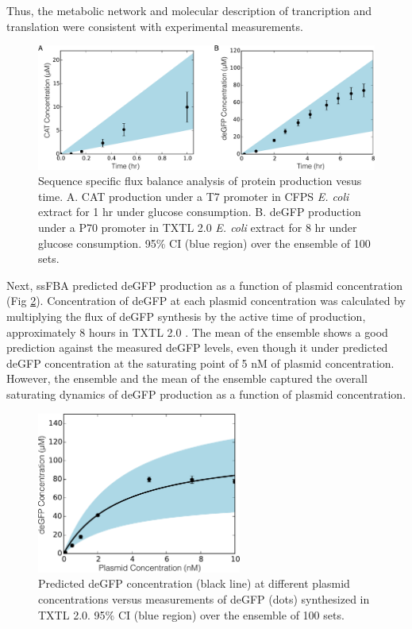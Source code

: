 \documentclass[journal=asbcd6,manuscript=article]{achemso}
\begin{document}
Thus, the metabolic network and molecular description of trancription and translation were consistent with experimental measurements.
\begin{figure}[t!]
\centering
\includegraphics[width=1.00\textwidth]{./Figures/CAT_GFP_prod.pdf}
\caption{Sequence specific flux balance analysis of protein production vesus time. A. CAT production under a T7 promoter in CFPS \textit{E. coli} extract for 1 hr under glucose consumption. B. deGFP production under a P70 promoter in TXTL 2.0 \textit{E. coli} extract for 8 hr under glucose consumption. 95\% CI (blue region) over the ensemble of 100 sets.}
\label{fig:CAT_GFP_prod}
\end{figure}

Next, ssFBA predicted deGFP production as a function of plasmid concentration (Fig \ref{fig:GFP_plasmid}).
Concentration of deGFP at each plasmid concentration was calculated by multiplying the flux of deGFP synthesis by the active time of production, approximately 8 hours in TXTL 2.0 \cite{2016_Garamella_etal_TXTL}. 
The mean of the ensemble shows a good prediction against the measured deGFP levels, even though it under predicted deGFP concentration at the saturating point of 5 nM of plasmid concentration.  
However, the ensemble and the mean of the ensemble captured the overall saturating dynamics of deGFP production as a function of plasmid concentration.
\begin{figure}[t!]
\centering
\includegraphics[width=0.6\textwidth]{./Figures/GFP_plasmid.pdf}
\caption{Predicted deGFP concentration (black line) at different plasmid concentrations versus measurements of deGFP (dots) synthesized in TXTL 2.0. 95\% CI (blue region) over the ensemble of 100 sets.}
\label{fig:GFP_plasmid}
\end{figure}
\end{document}
